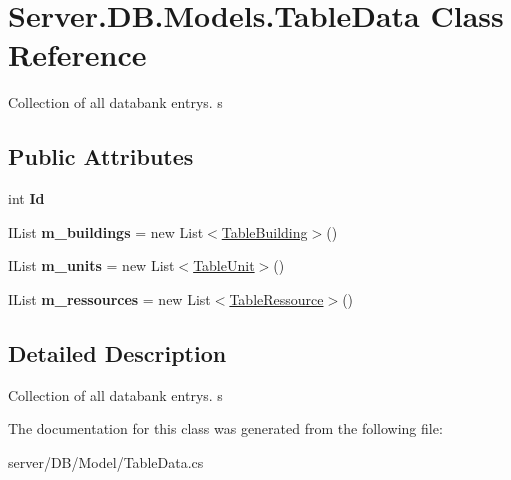 \hypertarget{classServer_1_1DB_1_1Models_1_1TableData}{\section{Server.\-D\-B.\-Models.\-Table\-Data Class Reference}
\label{classServer_1_1DB_1_1Models_1_1TableData}
}


Collection of all databank entrys. s  


\subsection*{Public Attributes}
\begin{DoxyCompactItemize}
\item 
\hypertarget{classServer_1_1DB_1_1Models_1_1TableData_a61d88561b8476093477f356616571c5a}{int {\bfseries Id}}\label{classServer_1_1DB_1_1Models_1_1TableData_a61d88561b8476093477f356616571c5a}

\item 
\hypertarget{classServer_1_1DB_1_1Models_1_1TableData_a794cd107b51c1f846eb8d0cecc104b25}{I\-List {\bfseries m\-\_\-buildings} = new List$<$\hyperlink{classServer_1_1DB_1_1Models_1_1TableBuilding}{Table\-Building}$>$()}\label{classServer_1_1DB_1_1Models_1_1TableData_a794cd107b51c1f846eb8d0cecc104b25}

\item 
\hypertarget{classServer_1_1DB_1_1Models_1_1TableData_a03e30c57aeab8353a166f923eea5a6cb}{I\-List {\bfseries m\-\_\-units} = new List$<$\hyperlink{classServer_1_1DB_1_1Models_1_1TableUnit}{Table\-Unit}$>$()}\label{classServer_1_1DB_1_1Models_1_1TableData_a03e30c57aeab8353a166f923eea5a6cb}

\item 
\hypertarget{classServer_1_1DB_1_1Models_1_1TableData_a5fe881c92c275661952051f98f95cb64}{I\-List {\bfseries m\-\_\-ressources} = new List$<$\hyperlink{classServer_1_1DB_1_1Models_1_1TableRessource}{Table\-Ressource}$>$()}\label{classServer_1_1DB_1_1Models_1_1TableData_a5fe881c92c275661952051f98f95cb64}

\end{DoxyCompactItemize}


\subsection{Detailed Description}
Collection of all databank entrys. s 



The documentation for this class was generated from the following file\-:\begin{DoxyCompactItemize}
\item 
server/\-D\-B/\-Model/Table\-Data.\-cs\end{DoxyCompactItemize}
